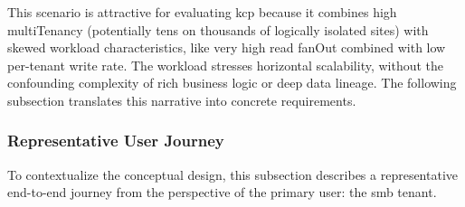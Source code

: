 \documentclass[11pt, a4paper, oneside, listof=totoc]{scrartcl}
\begin{document}
            This scenario is attractive for evaluating \gls{kcp} because it combines high
            \gls{multiTenancy} (potentially tens on thousands of logically isolated sites) with
            skewed workload characteristics, like very high read \gls{fanOut} combined with low
            per-tenant write rate.
            The workload stresses horizontal scalability, without the confounding complexity of rich
            business logic or deep data lineage.
            The following subsection translates this narrative into concrete requirements.

            \subsubsection{Representative User Journey}\label{subsubsec:userJourney}
                To contextualize the conceptual design, this subsection describes a representative
                end-to-end journey from the perspective of the primary user: the \gls{smb} tenant.
\end{document}
